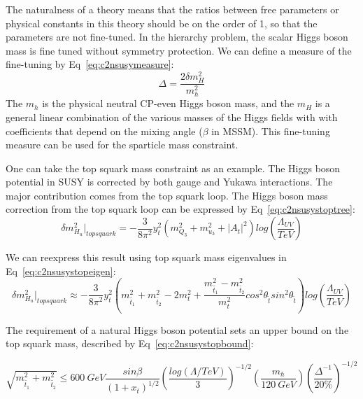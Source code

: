 The naturalness of a theory means that the ratios between free parameters or physical constants in this theory should be on the order of 1, so that the parameters are not fine-tuned. In the hierarchy problem, the scalar Higgs boson mass is fine tuned without symmetry protection. We can define a measure of the fine-tuning by Eq~\ref{eq:c2nsusymeasure}:
\begin{equation}
 \Delta = \frac{2\delta m_{H}^{2}}{m_{h}^{2}}
 \label{eq:c2nsusymeasure}
\end{equation}
The $m_{h}$ is the physical neutral CP-even Higgs boson mass, and the $m_{H}$ is a general linear combination of the various masses of the Higgs fields with with coefficients that depend on the mixing angle ($\beta$ in MSSM). This fine-tuning measure can be used for the sparticle mass constraint. 

One can take the top squark mass constraint as an example. The Higgs boson potential in SUSY is corrected by both gauge and Yukawa interactions. The major contribution comes from the top squark loop. The Higgs boson mass correction from the top squark loop can be expressed by Eq~\ref{eq:c2nsusystoptree}: 
\begin{equation}
 \delta m_{H_{u}}^{2}|_{top squark} = - \frac{3}{8\pi^{2}}y_{t}^{2}(m_{Q_{3}}^{2}+m_{u_{3}}^{2}+|A_{t}|^{2})log(\frac{\Lambda_{UV}}{TeV})
 \label{eq:c2nsusystoptree}
\end{equation}

We can reexpress this result using top squark mass eigenvalues in Eq~\ref{eq:c2nsusystopeigen}:
\begin{equation}
	\delta m_{H_{u}}^{2}|_{top squark} \approx - \frac{3}{8\pi^{2}}y_{t}^{2}(m_{\tilde{t_{1}}}^{2}+m_{\tilde{t_{2}}}^{2}-2m_{t}^{2}+\frac{m_{\tilde{t_{1}}}^{2}-m_{\tilde{t_{2}}}^{2}}{m_{t}^{2}}cos^{2}\theta_{\tilde{t}}sin^{2}\theta_{\tilde{t}})log(\frac{\Lambda_{UV}}{TeV})
 \label{eq:c2nsusystopeigen}
\end{equation}

The requirement of a natural Higgs boson potential sets an upper bound on the top squark mass\cite{Papucci:2011wy}, described by Eq~\ref{eq:c2nsusystopbound}:

\begin{equation}
 \sqrt{m_{\tilde{t_{1}}}^{2}+m_{\tilde{t_{2}}}^{2}} \leq 600~GeV\frac{sin\beta}{(1+x_{t})^{1/2}} (\frac{log(\Lambda/TeV)}{3})^{-1/2}(\frac{m_{h}}{120~GeV})(\frac{\Delta^{-1}}{20\%})^{-1/2}
 \label{eq:c2nsusystopbound}
\end{equation}

